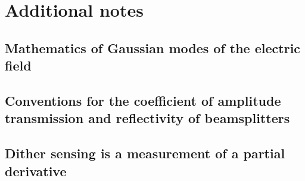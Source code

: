 \chapter{Additional notes}

\section{Mathematics of Gaussian modes of the electric field}

\label{ap:HGmode}

\section{Conventions for the coefficient of amplitude transmission and reflectivity of beamsplitters}

\section{Dither sensing is a measurement of a partial derivative}

